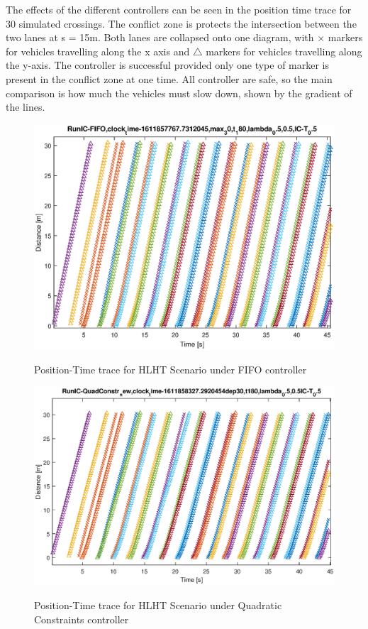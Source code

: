The effects of the different controllers can be seen in the position time trace for 30 simulated crossings. The conflict zone is protects the intersection between the two lanes at s = 15m. Both lanes are collapsed onto one diagram, with $\times$ markers for vehicles travelling along the x axis and $\bigtriangleup$ markers for vehicles travelling along the y-axis. The controller is successful provided only one type of marker is present in the conflict zone at one time. All controller are safe, so the main comparison is how much the vehicles must slow down, shown by the gradient of the lines.  
\begin{figure}
\includegraphics[width=1.0\linewidth]{results_fig/FIFO-HTHL_s-t.eps}
\label{fig:fifo_hlht}
\caption{Position-Time trace for HLHT Scenario under FIFO controller}
\end{figure}
\begin{figure}
\includegraphics[width=1.0\linewidth]{results_fig/IC-QuadConstr_HLHT_s-t.eps}
\label{fig:quad_hlht}
\caption{Position-Time trace for HLHT Scenario under Quadratic Constraints controller}
\end{figure}
